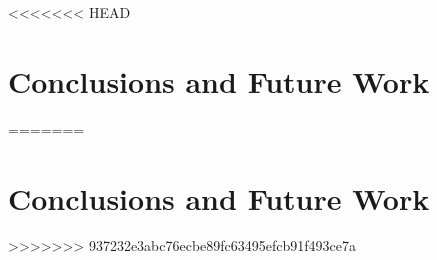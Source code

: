 <<<<<<< HEAD
\chapter{Conclusions and Future Work\label{chap:con}}
=======
\chapter{Conclusions and Future Work}



>>>>>>> 937232e3abc76ecbe89fc63495efcb91f493ce7a
